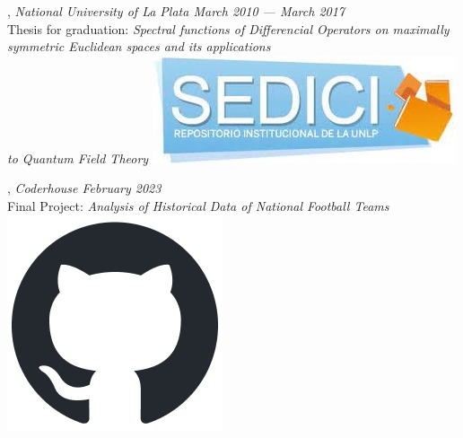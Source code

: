 
, \textit{National University of La Plata	\hfill March 2010 --- March 2017}
\\ \hspace{0.3cm}  Thesis for graduation: \textit{Spectral functions of Differencial Operators on maximally symmetric Euclidean spaces and its applications
\\ \hspace{0.3cm} to Quantum Field Theory} \hspace{0.1 cm} \href{http://sedici.unlp.edu.ar/handle/10915/77384}{\includegraphics[scale=0.08]{sedici.jpg}}

\vspace{0.1 cm}

, \textit{Coderhouse \hfill	February 2023}
\\ \hspace{0.3 cm}  Final Project: \textit{Analysis of Historical Data of National Football Teams} \hspace{0.1 cm} \href{https://github.com/juanjogervasio/Data-Analytics-Coderhouse}{\includegraphics[scale=0.2]{github-mark.png}}

\vspace{0.1 cm}


